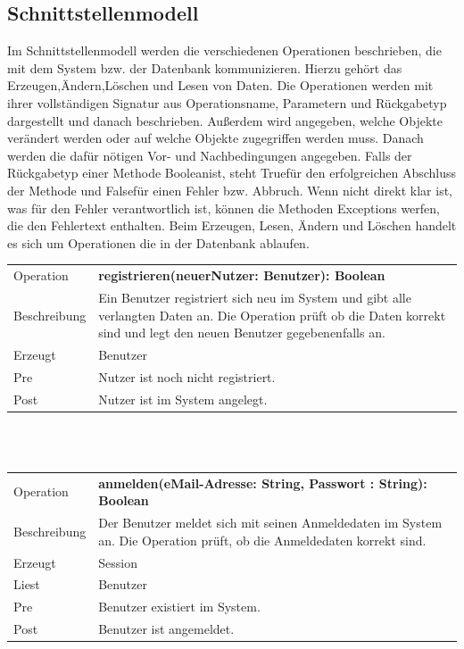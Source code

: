 \documentclass[12pt,a4paper]{article}
\begin{document}
{\subsection{Schnittstellenmodell}
Im Schnittstellenmodell werden die verschiedenen Operationen beschrieben, die mit dem System bzw. der Datenbank kommunizieren. Hierzu gehört das Erzeugen,Ändern,Löschen und Lesen von Daten. Die Operationen werden mit ihrer vollständigen Signatur aus Operationsname, Parametern und Rückgabetyp dargestellt und danach beschrieben. Außerdem wird angegeben, welche Objekte verändert werden oder auf welche Objekte zugegriffen werden muss. Danach werden die dafür nötigen Vor- und Nachbedingungen angegeben. Falls der Rückgabetyp einer Methode \glqq Boolean\grqq ist, steht \glqq True\grqq für den erfolgreichen Abschluss der Methode und \glqq False\grqq für einen Fehler bzw. Abbruch. Wenn nicht direkt klar ist, was für den Fehler verantwortlich ist, können die Methoden Exceptions werfen, die den Fehlertext enthalten. Beim Erzeugen, Lesen, Ändern und Löschen handelt es sich um Operationen die in der Datenbank ablaufen.
\newline

\begin{tabular}{|l|p{12cm}|}
	\hline
	Operation &  \textbf{registrieren(neuerNutzer: Benutzer): Boolean }\\ 
	Beschreibung & Ein Benutzer registriert sich neu im System und gibt alle verlangten Daten an. Die Operation prüft ob die Daten korrekt sind und legt den neuen Benutzer gegebenenfalls an.\\ 
	Erzeugt &  Benutzer\\ 
	Pre &  Nutzer ist noch nicht registriert. \\ 
	Post & Nutzer ist im System angelegt.  \\ 
	\hline 
\end{tabular} \\\\

\begin{tabular}{|l|p{12cm}|}
	\hline
	Operation &  \textbf{anmelden(eMail-Adresse: String, Passwort : String): Boolean} \\ 
	Beschreibung &  Der Benutzer meldet sich mit seinen Anmeldedaten im System an. Die Operation prüft, ob die Anmeldedaten korrekt sind.\\ 
	Erzeugt & Session \\ 
	Liest & Benutzer \\ 
	Pre & Benutzer existiert im System. \\ 
	Post & Benutzer ist angemeldet. \\ 
	\hline 
\end{tabular} \\\\

}
\end{document}
